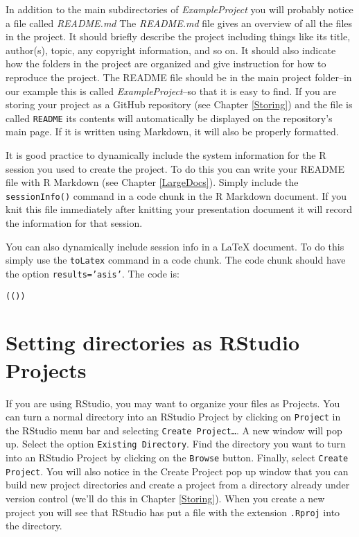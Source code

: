 In addition to the main subdirectories of {\emph{ExampleProject}} you will probably notice a file called {\emph{README.md}} The {\emph{README.md}} file gives an overview of all the files in the project. It should briefly describe the project including things like its title, author(s), topic, any copyright information, and so on. It should also indicate how the folders in the project are organized and give instruction for how to reproduce the project. The README file should be in the main project folder--in our example this is called {\emph{ExampleProject}}--so that it is easy to find. If you are storing your project as a GitHub repository (see Chapter \ref{Storing}) and the file is called \texttt{README} its contents will automatically be displayed on the repository's main page. If it is written using Markdown, it will also be properly formatted.

It is good practice to dynamically include the system information for the R session you used to create the project. To do this you can write your README file with R Markdown (see Chapter \ref{LargeDocs}). Simply include the \texttt{sessionInfo()} command in a code chunk in the R Markdown document. If you knit this file immediately after knitting your presentation document it will record the information for that session.

You can also dynamically include session info in a LaTeX document. To do this simply use the {\tt{toLatex}} command in a code chunk. The code chunk should have the option \texttt{results='asis'}. The code is:

\begin{knitrout}
\color{fgcolor}\begin{kframe}
\begin{alltt}
(())
\end{alltt}
\end{kframe}
\end{knitrout}



\section{Setting directories as RStudio Projects}

If you are using RStudio, you may want to organize your files as Projects. You can turn a normal directory into an RStudio Project by clicking on \texttt{Project} in the RStudio menu bar and selecting \texttt{Create Project\ldots}. A new window will pop up. Select the option \texttt{Existing Directory}. Find the directory you want to turn into an RStudio Project by clicking on the \texttt{Browse} button. Finally, select \texttt{Create Project}. You will also notice in the Create Project pop up window that you can build new project directories and create a project from a directory already under version control (we'll do this in Chapter \ref{Storing}). When you create a new project you will see that RStudio has put a file with the extension \texttt{.Rproj} into the directory.

